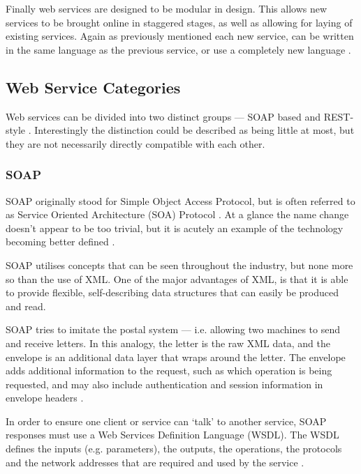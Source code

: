 Finally web services are designed to be modular in design. This allows new 
services to be brought online in staggered stages, as well as allowing for 
laying of existing services. Again as previously mentioned each new service, 
can be written in the same language as the previous service, or use a completely 
new language \citep{kalin13}. 


\subsection{Web Service Categories}

Web services can be divided into two distinct groups --- SOAP based and 
REST-style \citep{kalin13}. Interestingly the distinction could be described 
as being little at most, but they are not necessarily directly compatible with 
each other. 


\subsubsection{SOAP}

SOAP originally stood for Simple Object Access Protocol, but is often referred 
to as Service Oriented Architecture (SOA) Protocol \citep{kalin13}. At a glance
the name change doesn't appear to be too trivial, but it is acutely an example 
of the technology becoming better defined \citep{kalin13}.

SOAP utilises concepts that can be seen throughout the industry, but none more 
so than the use of XML. One of the major advantages of XML, is that it is able 
to provide flexible, self-describing data structures that can easily be 
produced and read.

SOAP tries to imitate the postal system --- i.e. allowing two machines to send 
and receive letters. In this analogy, the letter is the raw XML data, and the 
envelope is an additional data layer that wraps around the letter. The envelope
adds additional information to the request, such as which operation is being 
requested, and may also include authentication and session information in 
envelope headers \citep{gershon04}.

In order to ensure one client or service can `talk' to another service, SOAP 
responses must use a Web Services Definition Language (WSDL). The WSDL defines 
the inputs (e.g. parameters), the outputs, the operations, the protocols and 
the network addresses that are required and used by the service 
\citep{gershon04}.

